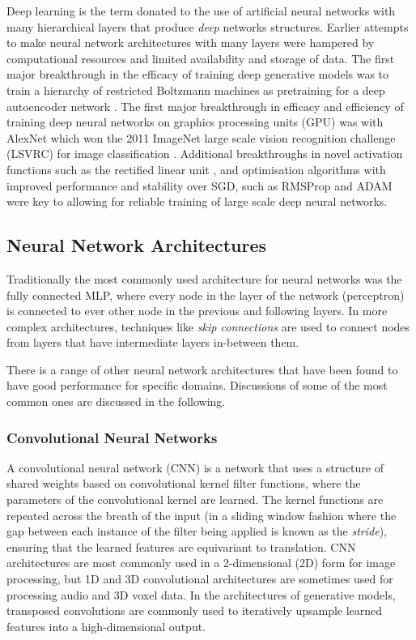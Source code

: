 Deep learning is the term donated to the use of artificial neural networks with many hierarchical layers that produce \textit{deep} networks structures. 
Earlier attempts to make neural network architectures with many layers were hampered by computational resources and limited availability and storage of data. 
The first major breakthrough in the efficacy of training deep generative models was to train a hierarchy of restricted Boltzmann machines \citep{ackley1985learning} as pretraining for a deep autoencoder network \citep{hinton2006reducing}. 
The first major breakthrough in efficacy and efficiency of training deep neural networks on graphics processing units (GPU) was with AlexNet \citep{krizhevsky2012imagenet} which won the 2011 ImageNet large scale vision recognition challenge (LSVRC) for image classification \citep{russakovsky2015imagenet}. 
Additional breakthroughs in novel activation functions such as the rectified linear unit \citep{nair2010rectified}, and optimisation algorithms with improved performance and stability over SGD, such as RMSProp \citep{tieleman2012lecture} and ADAM \citep{kingma2015adam} were key to allowing for reliable training of large scale deep neural networks. 

\subsection{Neural Network Architectures}

Traditionally the most commonly used architecture for neural networks was the fully connected MLP, where every node in the layer of the network (perceptron) is connected to ever other node in the previous and following layers. 
In more complex architectures, techniques like \textit{skip connections} are used to connect nodes from layers that have intermediate layers in-between them. 

There is a range of other neural network architectures that have been found to have good performance for specific domains. 
Discussions of some of the most common ones are discussed in the following.


\subsubsection{Convolutional Neural Networks}

A convolutional neural network (CNN) \citep{fukushima1982neocognitron} is a network that uses a structure of shared weights based on convolutional kernel filter functions, where the parameters of the convolutional kernel are learned. 
The kernel functions are repeated across the breath of the input (in a sliding window fashion where the gap between each instance of the filter being applied is known as the \textit{stride}), ensuring that the learned features are equivariant to translation. 
CNN architectures are most commonly used in a 2-dimensional (2D) form for image processing, but 1D and 3D convolutional architectures are sometimes used for processing audio and 3D voxel data. 
In the architectures of generative models, transposed convolutions are commonly used to iteratively upsample learned features into a high-dimensional output.

